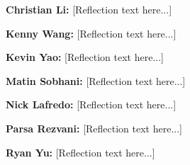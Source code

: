 \documentclass[journal, onecolumn]{IEEEtran}
\begin{document}
\textbf{Christian Li:} [Reflection text here...]
\vspace{1em}

\textbf{Kenny Wang:} [Reflection text here...]
\vspace{1em}

\textbf{Kevin Yao:} [Reflection text here...]
\vspace{1em}

\textbf{Matin Sobhani:} [Reflection text here...]
\vspace{1em}

\textbf{Nick Lafredo:} [Reflection text here...]
\vspace{1em}

\textbf{Parsa Rezvani:} [Reflection text here...]
\vspace{1em}

\textbf{Ryan Yu:} [Reflection text here...]
\end{document}
